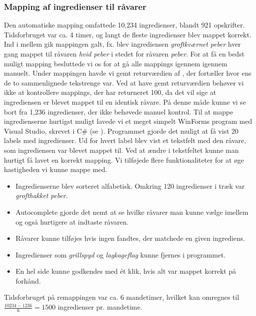 \subsubsection{Mapping af ingredienser til råvarer}
Den automatiske mapping omfattede 10,234 ingredienser, blandt 921 opskrifter. Tidsforbruget var ca. 4 timer, og langt de fleste ingredienser blev mappet korrekt. Ind i mellem gik mappingen galt, fx. blev ingrediensen \textit{groftkværnet peber} hver gang mappet til råvaren \textit{hvid peber} i stedet for råvaren \textit{peber}. For at få en bedst muligt mapping besluttede vi os for at gå alle mappings igennem igennem manuelt. Under mappingen havde vi gemt returværdien af , der fortæller hvor ens de to sammenlignede tekstrenge var. Ved at have gemt returværdien behøver vi ikke at kontrollere mappings, der har returneret 100, da det vil sige at ingrediensen er blevet mappet til en identisk råvare. På denne måde kunne vi se bort fra 1,236 ingredienser, der ikke behøvede manuel kontrol.
Til at mappe ingredienserne hurtigst muligt lavede vi et meget simpelt WinForms program med Visual Studio, skrevet i C\# (se ). Programmet gjorde det muligt at få vist 20 labels med ingredienser. Ud for hvert label blev vist et tekstfelt med den råvare, som ingrediensen var blevet mappet til. Ved at ændre i tekstfeltet kunne man hurtigt få lavet en korrekt mapping. Vi tilføjede flere funktionaliteter for at øge hastigheden vi kunne mappe med.
\begin{itemize}
\item Ingredienserne blev sorteret alfabetisk. Omkring 120 ingredienser i træk var \textit{grofthakket peber}.
\item Autocomplete gjorde det nemt at se hvilke råvarer man kunne vælge imellem og også hurtigere at indtaste råvaren.
\item Råvarer kunne tilføjes hvis ingen fandtes, der matchede en given ingrediens.
\item Ingredienser som \fx \textit{grillspyd} og \textit{lagkageflag} kunne fjernes i programmet.
\item En hel side kunne godkendes med ét klik, hvis alt var mappet korrekt på forhånd.
\end{itemize}

Tidsforbruget på remappingen var ca. 6 mandetimer, hvilket kan omregnes til $\frac{10234 - 1236}{6} = 1500$ ingredienser pr. mandetime.
